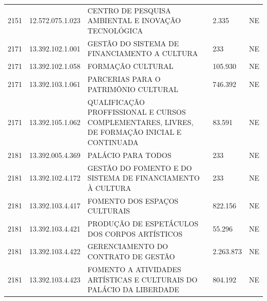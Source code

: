 \documentclass{article}
\begin{document}
\begin{longtable}[c]{m{1cm}|m{2cm}|m{10cm}|m{2cm}|m{1cm}}
\multicolumn{1}{C{1cm}|}{2151} & \multicolumn{1}{C{2cm}|}{12.572.075.1.023} & \multicolumn{1}{L{10cm}|}{CENTRO DE PESQUISA AMBIENTAL E INOVAÇÃO TECNOLÓGICA} & \multicolumn{1}{R{2cm}|}{2.335} & \multicolumn{1}{C{1cm}}{NE} \\
\multicolumn{1}{C{1cm}|}{2171} & \multicolumn{1}{C{2cm}|}{13.392.102.1.001} & \multicolumn{1}{L{10cm}|}{GESTÃO DO SISTEMA DE FINANCIAMENTO A CULTURA} & \multicolumn{1}{R{2cm}|}{233} & \multicolumn{1}{C{1cm}}{NE} \\
\multicolumn{1}{C{1cm}|}{2171} & \multicolumn{1}{C{2cm}|}{13.392.102.1.058} & \multicolumn{1}{L{10cm}|}{FORMAÇÃO CULTURAL} & \multicolumn{1}{R{2cm}|}{105.930} & \multicolumn{1}{C{1cm}}{NE} \\
\multicolumn{1}{C{1cm}|}{2171} & \multicolumn{1}{C{2cm}|}{13.392.103.1.061} & \multicolumn{1}{L{10cm}|}{PARCERIAS PARA O PATRIMÔNIO CULTURAL} & \multicolumn{1}{R{2cm}|}{746.392} & \multicolumn{1}{C{1cm}}{NE} \\
\multicolumn{1}{C{1cm}|}{2171} & \multicolumn{1}{C{2cm}|}{13.392.105.1.062} & \multicolumn{1}{L{10cm}|}{QUALIFICAÇÃO PROFFISSIONAL E CURSOS COMPLEMENTARES, LIVRES, DE FORMAÇÃO INICIAL E CONTINUADA} & \multicolumn{1}{R{2cm}|}{83.591} & \multicolumn{1}{C{1cm}}{NE} \\
\multicolumn{1}{C{1cm}|}{2181} & \multicolumn{1}{C{2cm}|}{13.392.005.4.369} & \multicolumn{1}{L{10cm}|}{PALÁCIO PARA TODOS} & \multicolumn{1}{R{2cm}|}{233} & \multicolumn{1}{C{1cm}}{NE} \\
\multicolumn{1}{C{1cm}|}{2181} & \multicolumn{1}{C{2cm}|}{13.392.102.4.172} & \multicolumn{1}{L{10cm}|}{GESTÃO DO FOMENTO E DO SISTEMA DE FINANCIAMENTO À CULTURA} & \multicolumn{1}{R{2cm}|}{233} & \multicolumn{1}{C{1cm}}{NE} \\
\multicolumn{1}{C{1cm}|}{2181} & \multicolumn{1}{C{2cm}|}{13.392.103.4.417} & \multicolumn{1}{L{10cm}|}{FOMENTO DOS ESPAÇOS CULTURAIS} & \multicolumn{1}{R{2cm}|}{822.156} & \multicolumn{1}{C{1cm}}{NE} \\
\multicolumn{1}{C{1cm}|}{2181} & \multicolumn{1}{C{2cm}|}{13.392.103.4.421} & \multicolumn{1}{L{10cm}|}{PRODUÇÃO DE ESPETÁCULOS DOS CORPOS ARTÍSTICOS} & \multicolumn{1}{R{2cm}|}{55.296} & \multicolumn{1}{C{1cm}}{NE} \\
\multicolumn{1}{C{1cm}|}{2181} & \multicolumn{1}{C{2cm}|}{13.392.103.4.422} & \multicolumn{1}{L{10cm}|}{GERENCIAMENTO DO CONTRATO DE GESTÃO} & \multicolumn{1}{R{2cm}|}{2.263.873} & \multicolumn{1}{C{1cm}}{NE} \\
\multicolumn{1}{C{1cm}|}{2181} & \multicolumn{1}{C{2cm}|}{13.392.103.4.423} & \multicolumn{1}{L{10cm}|}{FOMENTO A ATIVIDADES ARTÍSTICAS E CULTURAIS DO PALÁCIO DA LIBERDADE} & \multicolumn{1}{R{2cm}|}{804.192} & \multicolumn{1}{C{1cm}}{NE} \\

\end{longtable}
\end{document}
